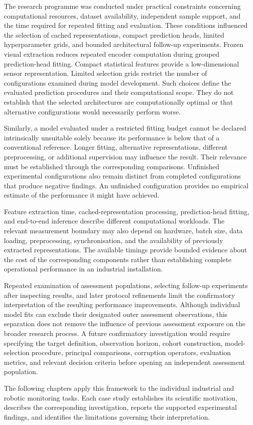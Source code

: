 The research programme was conducted under practical constraints concerning computational resources, dataset availability, independent sample support, and the time required for repeated fitting and evaluation. These conditions influenced the selection of cached representations, compact prediction heads, limited hyperparameter grids, and bounded architectural follow-up experiments. Frozen visual extraction reduces repeated encoder computation during grouped prediction-head fitting. Compact statistical features provide a low-dimensional sensor representation. Limited selection grids restrict the number of configurations examined during model development. Such choices define the evaluated prediction procedures and their computational scope. They do not establish that the selected architectures are computationally optimal or that alternative configurations would necessarily perform worse.

Similarly, a model evaluated under a restricted fitting budget cannot be declared intrinsically unsuitable solely because its performance is below that of a conventional reference. Longer fitting, alternative representations, different preprocessing, or additional supervision may influence the result. Their relevance must be established through the corresponding comparisons. Unfinished experimental configurations also remain distinct from completed configurations that produce negative findings. An unfinished configuration provides no empirical estimate of the performance it might have achieved.

Feature extraction time, cached-representation processing, prediction-head fitting, and end-to-end inference describe different computational workloads. The relevant measurement boundary may also depend on hardware, batch size, data loading, preprocessing, synchronisation, and the availability of previously extracted representations. The available timings provide bounded evidence about the cost of the corresponding components rather than establishing complete operational performance in an industrial installation.

Repeated examination of assessment populations, selecting follow-up experiments after inspecting results, and later protocol refinements limit the confirmatory interpretation of the resulting performance improvements. Although individual model fits can exclude their designated outer assessment observations, this separation does not remove the influence of previous assessment exposure on the broader research process. A future confirmatory investigation would require specifying the target definition, observation horizon, cohort construction, model-selection procedure, principal comparisons, corruption operators, evaluation metrics, and relevant decision criteria before opening an independent assessment population.

The following chapters apply this framework to the individual industrial and robotic monitoring tasks. Each case study establishes its scientific motivation, describes the corresponding investigation, reports the supported experimental findings, and identifies the limitations governing their interpretation.
